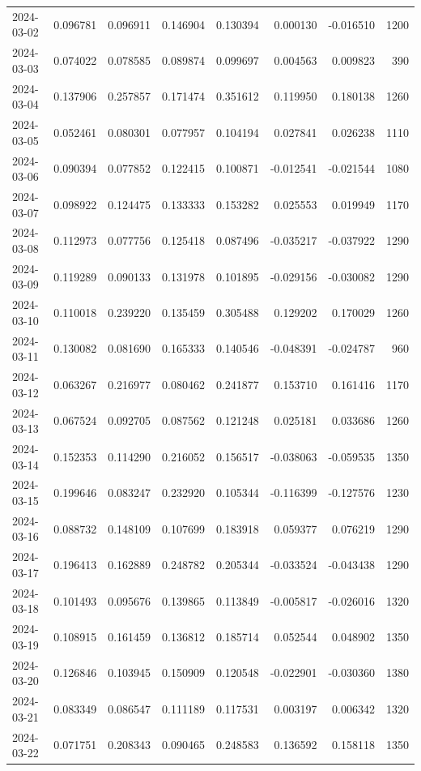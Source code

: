 \begin{tabular}{lrrrrrrr}
2024-03-02 & 0.096781 & 0.096911 & 0.146904 & 0.130394 & 0.000130 & -0.016510 & 1200 \\
2024-03-03 & 0.074022 & 0.078585 & 0.089874 & 0.099697 & 0.004563 & 0.009823 & 390 \\
2024-03-04 & 0.137906 & 0.257857 & 0.171474 & 0.351612 & 0.119950 & 0.180138 & 1260 \\
2024-03-05 & 0.052461 & 0.080301 & 0.077957 & 0.104194 & 0.027841 & 0.026238 & 1110 \\
2024-03-06 & 0.090394 & 0.077852 & 0.122415 & 0.100871 & -0.012541 & -0.021544 & 1080 \\
2024-03-07 & 0.098922 & 0.124475 & 0.133333 & 0.153282 & 0.025553 & 0.019949 & 1170 \\
2024-03-08 & 0.112973 & 0.077756 & 0.125418 & 0.087496 & -0.035217 & -0.037922 & 1290 \\
2024-03-09 & 0.119289 & 0.090133 & 0.131978 & 0.101895 & -0.029156 & -0.030082 & 1290 \\
2024-03-10 & 0.110018 & 0.239220 & 0.135459 & 0.305488 & 0.129202 & 0.170029 & 1260 \\
2024-03-11 & 0.130082 & 0.081690 & 0.165333 & 0.140546 & -0.048391 & -0.024787 & 960 \\
2024-03-12 & 0.063267 & 0.216977 & 0.080462 & 0.241877 & 0.153710 & 0.161416 & 1170 \\
2024-03-13 & 0.067524 & 0.092705 & 0.087562 & 0.121248 & 0.025181 & 0.033686 & 1260 \\
2024-03-14 & 0.152353 & 0.114290 & 0.216052 & 0.156517 & -0.038063 & -0.059535 & 1350 \\
2024-03-15 & 0.199646 & 0.083247 & 0.232920 & 0.105344 & -0.116399 & -0.127576 & 1230 \\
2024-03-16 & 0.088732 & 0.148109 & 0.107699 & 0.183918 & 0.059377 & 0.076219 & 1290 \\
2024-03-17 & 0.196413 & 0.162889 & 0.248782 & 0.205344 & -0.033524 & -0.043438 & 1290 \\
2024-03-18 & 0.101493 & 0.095676 & 0.139865 & 0.113849 & -0.005817 & -0.026016 & 1320 \\
2024-03-19 & 0.108915 & 0.161459 & 0.136812 & 0.185714 & 0.052544 & 0.048902 & 1350 \\
2024-03-20 & 0.126846 & 0.103945 & 0.150909 & 0.120548 & -0.022901 & -0.030360 & 1380 \\
2024-03-21 & 0.083349 & 0.086547 & 0.111189 & 0.117531 & 0.003197 & 0.006342 & 1320 \\
2024-03-22 & 0.071751 & 0.208343 & 0.090465 & 0.248583 & 0.136592 & 0.158118 & 1350 \\

\end{tabular}
